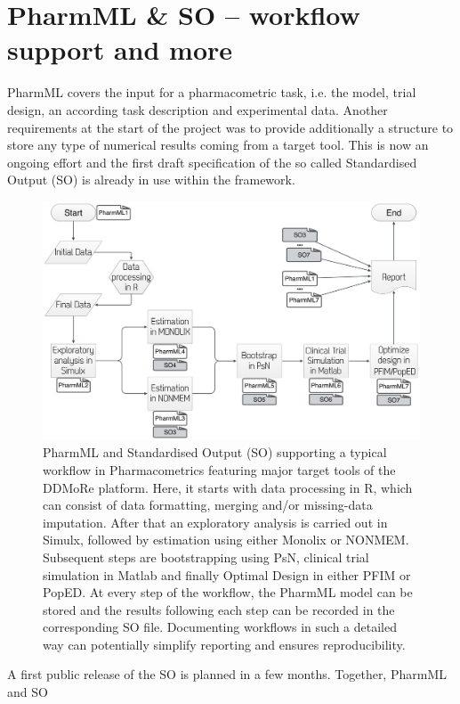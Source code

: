 \section{PharmML \& SO -- workflow support and more}
\label{intro:workflows}
PharmML covers the input for a pharmacometric task, i.e. the model, trial design, 
an according task description and experimental data. Another requirements 
at the start of the project was to provide additionally a structure to store any type
of numerical results coming from a target tool. This is now an ongoing 
effort and the first draft specification of the so called Standardised Output (SO)
is already in use within the framework.

\begin{figure}[ht!]
\centering
  \includegraphics[width=0.95\linewidth]{pics/workflowPharmMLSO}
 \caption{PharmML and Standardised Output (SO) supporting a typical 
 workflow in Pharmacometrics featuring major target tools of the DDMoRe 
 platform. Here, it starts with data processing in R, which can consist of data 
 formatting, merging and/or missing-data imputation. After that an exploratory  
 analysis is carried out in Simulx, followed by estimation using either Monolix 
 or NONMEM. Subsequent steps are bootstrapping using PsN, clinical trial 
 simulation in Matlab and finally Optimal Design in either PFIM or PopED. 
 At every step of the workflow, the PharmML model can be stored and the 
 results following each step can be recorded in the corresponding SO file. 
 Documenting workflows in such a detailed way can potentially simplify 
 reporting and ensures reproducibility.}
 \label{fig:workflowPharmMLSO}
\end{figure}
A first public release of the SO is planned in a few months. Together, PharmML and SO 
